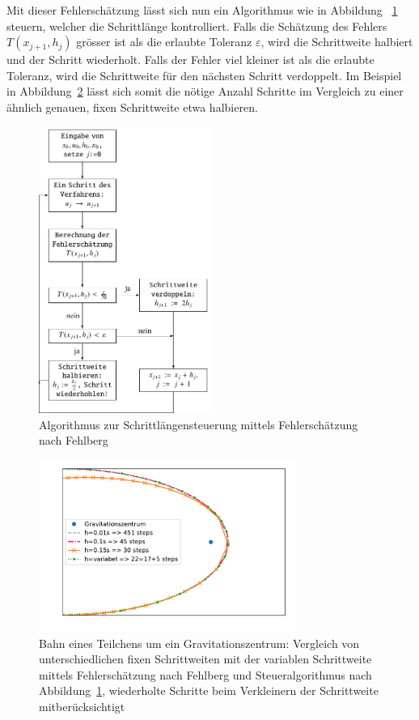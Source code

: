 Mit dieser Fehlerschätzung lässt sich nun ein Algorithmus wie in Abbildung ~\ref{buch:steps:flowchartfehlberg} steuern,
welcher die Schrittlänge kontrolliert. Falls die Schätzung des Fehlers $T(x_{j+1}, h_j)$ grösser ist als die erlaubte Toleranz $\varepsilon$,
wird die Schrittweite halbiert und der Schritt wiederholt.
Falls der Fehler viel kleiner ist als die erlaubte Toleranz, wird die Schrittweite für den nächsten Schritt verdoppelt.
Im Beispiel in Abbildung~\ref{buch:steps:comparisonFixedVariableFehlberg} lässt sich somit die nötige Anzahl Schritte
im Vergleich zu einer ähnlich genauen, fixen Schrittweite etwa halbieren.

\begin{figure}
  \centering
  \includegraphics[width=0.5\textwidth]{papers/steps/img/Fehlberg_Flowchart.pdf}
  \caption{Algorithmus zur Schrittlängensteuerung mittels Fehlerschätzung nach Fehlberg
  \cite{steps:Numerische-Mathematik}
    \label{buch:steps:flowchartfehlberg}}
\end{figure}

\begin{figure}
  \centering
  \includegraphics[width=0.75\textwidth]{papers/steps/img/comparison_fehlberg_ssc.pdf}
  \caption{Bahn eines Teilchens um ein Gravitationszentrum: Vergleich von unterschiedlichen fixen Schrittweiten
  mit der variablen Schrittweite mittels Fehlerschätzung nach Fehlberg und Steueralgorithmus nach Abbildung~\ref{buch:steps:flowchartfehlberg},
  wiederholte Schritte beim Verkleinern der Schrittweite mitberücksichtigt}
  \label{buch:steps:comparisonFixedVariableFehlberg}
\end{figure}
